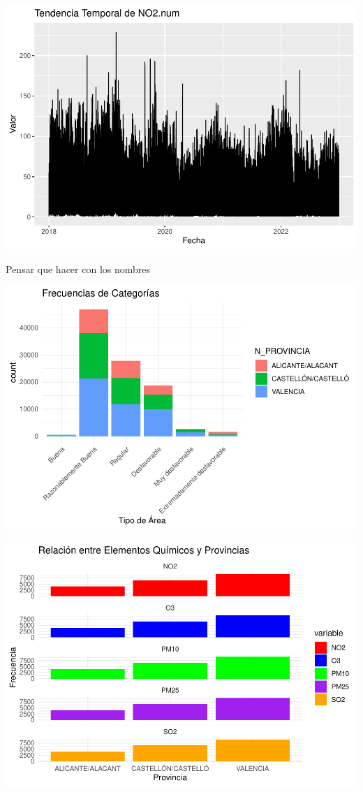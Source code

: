 \documentclass[notspecified,article,submit,moreauthors,pdftex]{Definitions/mdpi}
\begin{document}
\includegraphics{ProyectoAED2023_files/figure-latex/unnamed-chunk-28-1.pdf}

Pensar que hacer con los nombres

\includegraphics{ProyectoAED2023_files/figure-latex/unnamed-chunk-29-1.pdf}

\includegraphics{ProyectoAED2023_files/figure-latex/unnamed-chunk-30-1.pdf}
\end{document}
